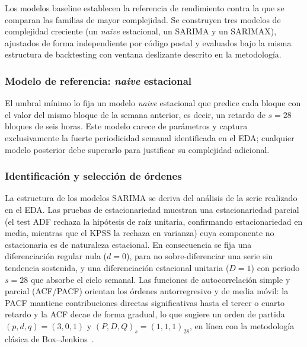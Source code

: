 \documentclass[12pt, a4paper]{article}
\begin{document}
Los modelos baseline establecen la referencia de rendimiento contra la que se comparan las familias de mayor complejidad. Se construyen tres modelos de complejidad creciente (un \textit{naive} estacional, un SARIMA y un SARIMAX), ajustados de forma independiente por código postal y evaluados bajo la misma estructura de backtesting con ventana deslizante descrito en la metodología.

\subsubsection{Modelo de referencia: \textit{naive} estacional}

El umbral mínimo lo fija un modelo \textit{naive} estacional que predice cada bloque con el valor del mismo bloque de la semana anterior, es decir, un retardo de $s=28$ bloques de seis horas. Este modelo carece de parámetros y captura exclusivamente la fuerte periodicidad semanal identificada en el EDA; cualquier modelo posterior debe superarlo para justificar su complejidad adicional.

\subsubsection{Identificación y selección de órdenes}

La estructura de los modelos SARIMA se deriva del análisis de la serie realizado en el EDA. Las pruebas de estacionariedad muestran una estacionariedad parcial (el test ADF rechaza la hipótesis de raíz unitaria, confirmando estacionariedad en media, mientras que el KPSS la rechaza en varianza) cuya componente no estacionaria es de naturaleza estacional. En consecuencia se fija una diferenciación regular nula ($d=0$), para no sobre-diferenciar una serie sin tendencia sostenida, y una diferenciación estacional unitaria ($D=1$) con periodo $s=28$ que absorbe el ciclo semanal. Las funciones de autocorrelación simple y parcial (ACF/PACF) orientan los órdenes autorregresivo y de media móvil: la PACF mantiene contribuciones directas significativas hasta el tercer o cuarto retardo y la ACF decae de forma gradual, lo que sugiere un orden de partida $(p,d,q)=(3,0,1)$ y $(P,D,Q)_s=(1,1,1)_{28}$, en línea con la metodología clásica de Box--Jenkins~\cite{boxjenkins2015}.
\end{document}
